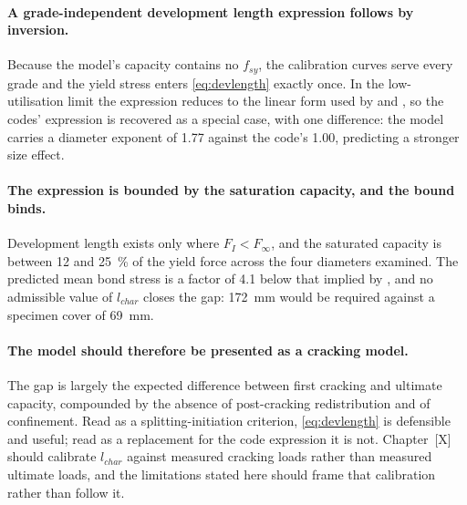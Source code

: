 \paragraph{A grade-independent development length expression follows by
inversion.}
Because the model's capacity contains no $f_{sy}$, the calibration curves
serve every grade and the yield stress enters \eqref{eq:devlength} exactly
once. In the low-utilisation limit the expression reduces to the linear form
used by \textcite{as3600ConcreteStructures2018} and
\textcite{cairnsBondAnchorageEmbedded2015}, so the codes' expression is
recovered as a special case, with one difference: the model carries a
diameter exponent of \num{1.77} against the code's \num{1.00}, predicting a
stronger size effect.

\paragraph{The expression is bounded by the saturation capacity, and the
bound binds.}
Development length exists only where $F_I < F_\infty$, and the saturated
capacity is between \SI{12}{} and \SI{25}{\percent} of the yield force
across the four diameters examined. The predicted mean bond stress is a
factor of \num{4.1} below that implied by
\textcite{fosterDevelopmentLapLengths}, and no admissible value of
$l_{char}$ closes the gap: \SI{172}{\milli\metre} would be required against
a specimen cover of \SI{69}{\milli\metre}.

\paragraph{The model should therefore be presented as a cracking model.}
The gap is largely the expected difference between first cracking and
ultimate capacity, compounded by the absence of post-cracking redistribution
and of confinement. Read as a splitting-initiation criterion,
\eqref{eq:devlength} is defensible and useful; read as a replacement for the
code expression it is not. Chapter~[X] should calibrate $l_{char}$ against
measured cracking loads rather than measured ultimate loads, and the
limitations stated here should frame that calibration rather than follow it.
